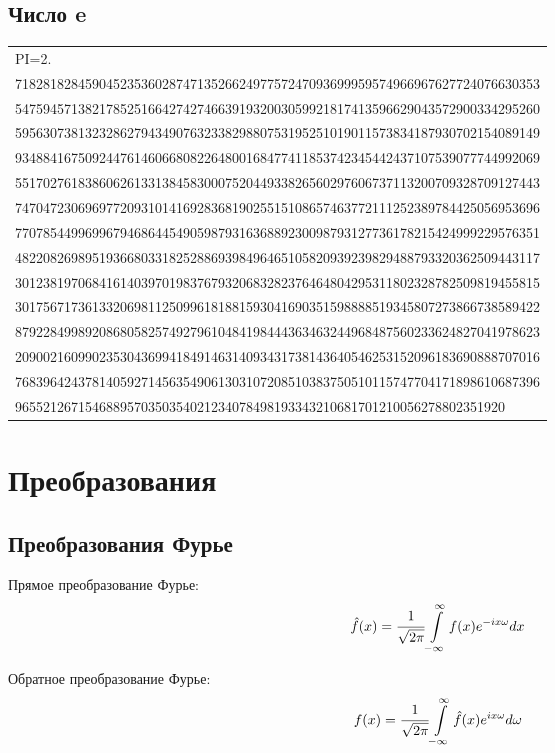 \documentclass[12pt, a6paper]{extarticle}
\begin{document}
\subsection{Число e}
\begin{tabular}{l}
PI=2.\\
718281828459045235360287471352662497757247093699959574966967627724076630353\\
547594571382178525166427427466391932003059921817413596629043572900334295260\\
595630738132328627943490763233829880753195251019011573834187930702154089149\\
934884167509244761460668082264800168477411853742345442437107539077744992069\\
551702761838606261331384583000752044933826560297606737113200709328709127443\\
747047230696977209310141692836819025515108657463772111252389784425056953696\\
770785449969967946864454905987931636889230098793127736178215424999229576351\\
482208269895193668033182528869398496465105820939239829488793320362509443117\\
301238197068416140397019837679320683282376464804295311802328782509819455815\\
301756717361332069811250996181881593041690351598888519345807273866738589422\\
879228499892086805825749279610484198444363463244968487560233624827041978623\\
209002160990235304369941849146314093431738143640546253152096183690888707016\\
768396424378140592714563549061303107208510383750510115747704171898610687396\\
9655212671546889570350354021234078498193343210681701210056278802351920
\end{tabular}

\newpage
\section{Преобразования}
\subsection{Преобразования Фурье}
Прямое преобразование Фурье:
$$ \hat f(x) = \cfrac{1}{\sqrt{2\pi}} \int\limits_{-\infty}^{\infty}{ f(x) e^{-ix\omega} dx} $$

Обратное преобразование Фурье:
$$ f(x) = \cfrac{1}{\sqrt{2\pi}} \int\limits_{-\infty}^{\infty}{ \hat f(x) e^{ix\omega} d\omega} $$
\end{document}
